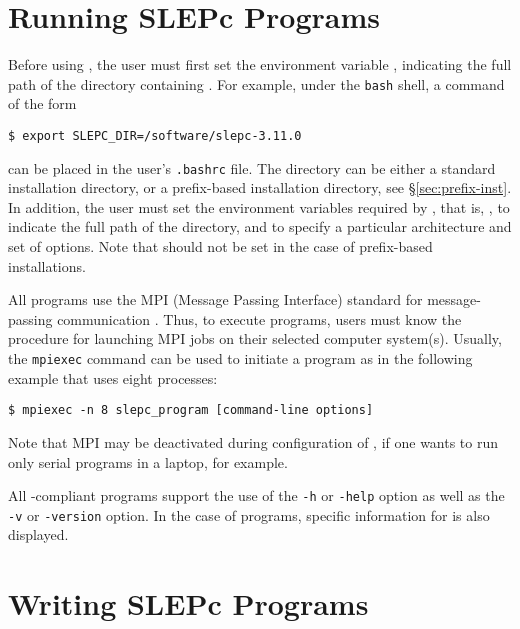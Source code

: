 
\section{Running SLEPc Programs}

Before using \slepc, the user must first set the environment variable
, indicating the full path of the directory containing \slepc. For example, under the \texttt{bash} shell, a command of the form
	\begin{Verbatim}[fontsize=\small]
	$ export SLEPC_DIR=/software/slepc-3.11.0
	\end{Verbatim}
can be placed in the user's \Verb!.bashrc! file.
The  directory can be either a standard installation \slepc directory, or a prefix-based installation directory, see \S\ref{sec:prefix-inst}.
In addition, the user must set the environment variables required by \petsc, that is, , to indicate the full path of the \petsc directory, and  to specify a particular architecture and set of options. Note that  should not be set in the case of prefix-based installations.

All \petsc programs use the MPI (Message Passing Interface) standard
for message-passing communication \citep{MPI-Forum:1994:MMI}.  Thus, to execute
\slepc programs, users must know the procedure for launching MPI jobs
on their selected computer system(s).  Usually, the \texttt{mpiexec} command can be used to initiate a program as in the following example that uses eight processes:
	\begin{Verbatim}[fontsize=\small]
	$ mpiexec -n 8 slepc_program [command-line options]
	\end{Verbatim}
Note that MPI may be deactivated during configuration of \petsc, if one wants to run only serial programs in a laptop, for example.

All \petsc-compliant programs support the use of the \Verb!-h!
or \Verb!-help! option as well as the \Verb!-v! or \Verb!-version! option. In the case of \slepc programs, specific information for \slepc is also displayed.

\section{Writing SLEPc Programs}

